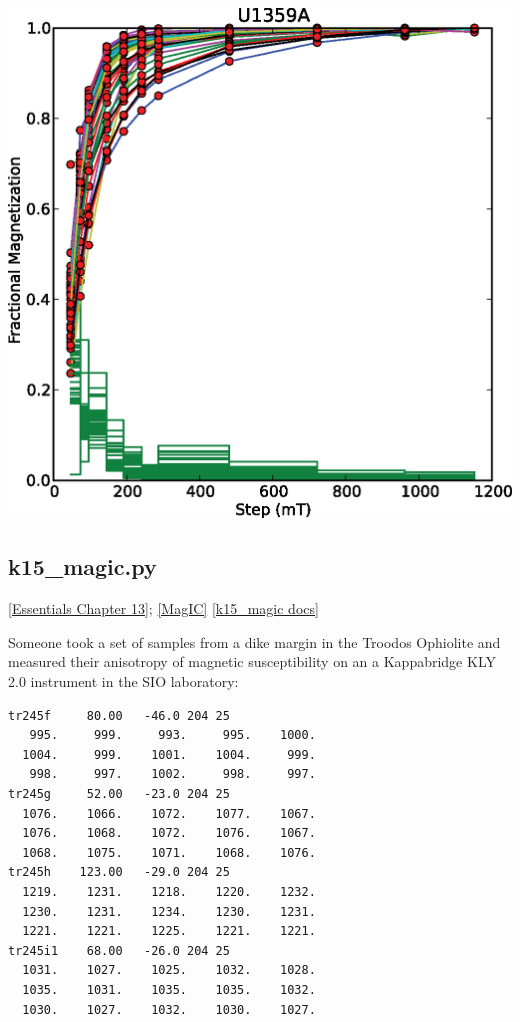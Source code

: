 \documentclass[11pt]{book}
\begin{document}
{{{\includegraphics[width=15cm]{EPSfiles/irmaq_magic.eps}

%
\subsection{k15\_magic.py} 
\href{http://magician.ucsd.edu/Essentials_2/WebBook2ch13.html#ch13}{[Essentials Chapter 13]}; 
\href{#MagIC}{[MagIC]}
\href{http://earthref.org/PmagPy/pmagpydocs/k15_magic-module.html}{[k15\_magic docs]}


Someone took a set of samples from a dike margin in the Troodos Ophiolite and measured their anisotropy of magnetic susceptibility on an a Kappabridge KLY 2.0 instrument in the SIO laboratory:

\begin{verbatim}
tr245f     80.00   -46.0 204 25
   995.     999.     993.     995.    1000.
  1004.     999.    1001.    1004.     999.
   998.     997.    1002.     998.     997.
tr245g     52.00   -23.0 204 25
  1076.    1066.    1072.    1077.    1067.
  1076.    1068.    1072.    1076.    1067.
  1068.    1075.    1071.    1068.    1076.
tr245h    123.00   -29.0 204 25
  1219.    1231.    1218.    1220.    1232.
  1230.    1231.    1234.    1230.    1231.
  1221.    1221.    1225.    1221.    1221.
tr245i1    68.00   -26.0 204 25
  1031.    1027.    1025.    1032.    1028.
  1035.    1031.    1035.    1035.    1032.
  1030.    1027.    1032.    1030.    1027.
  \end{verbatim}
  
}}}
\end{document}
